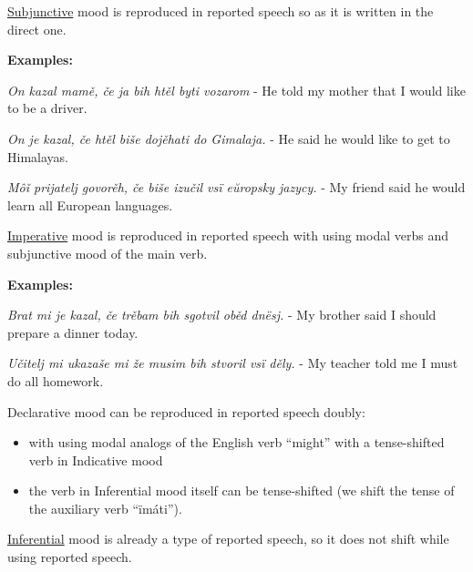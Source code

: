 \underline{Subjunctive} mood is reproduced in reported speech so as it is written in the direct one. 

\textbf{Examples:}

\textit{On kazal mamě, če ja bih htěl byti vozarom} - He told my mother that I would like to be a driver.

\textit{On je kazal, če htěl biše dojěhati do Gimalaja.} - He said he would like to get to Himalayas.

\textit{Môǐ prijatelj govorěh, če biše izučil vsï eŭropsky jazycy.} - My friend said he would learn all European languages.

\underline{Imperative} mood is reproduced in reported speech with using modal verbs and subjunctive mood of the main verb.

\textbf{Examples:}

\textit{Brat mi je kazal, če trěbam bih sgotvil oběd dnësj.} - My brother said I should prepare a dinner today.

\textit{Učitelj mi ukazaše mi že musim bih stvoril vsï děly.} - My teacher told me I must do all homework.

Declarative mood can be reproduced in reported speech doubly:

\begin{itemize}
	\item with using modal analogs of the English verb “might” with a tense-shifted verb in Indicative mood
	\item the verb in Inferential mood itself can be tense-shifted (we shift the tense of the auxiliary verb “ïmáti”).
\end{itemize}

\underline{Inferential} mood is already a type of reported speech, so it does not shift while using reported speech.
